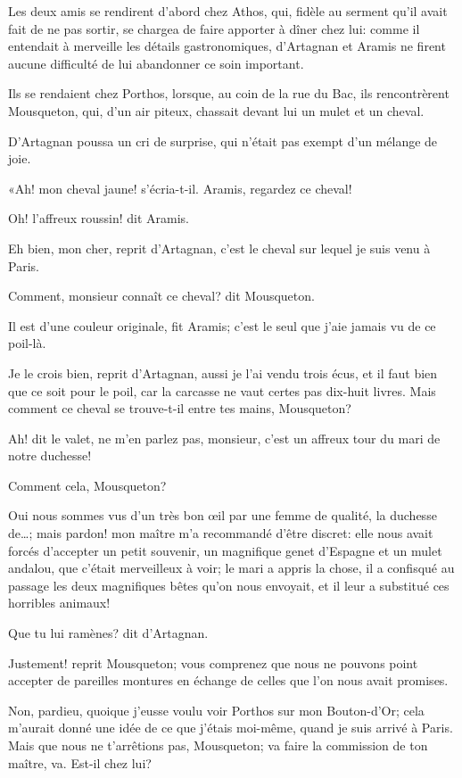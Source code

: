 Les deux amis se rendirent d'abord chez Athos, qui, fidèle au serment qu'il avait fait de ne pas sortir, se chargea de faire apporter à dîner chez lui: comme il entendait à merveille les détails gastronomiques, d'Artagnan et Aramis ne firent aucune difficulté de lui abandonner ce soin important. 

Ils se rendaient chez Porthos, lorsque, au coin de la rue du Bac, ils rencontrèrent Mousqueton, qui, d'un air piteux, chassait devant lui un mulet et un cheval. 

D'Artagnan poussa un cri de surprise, qui n'était pas exempt d'un mélange de joie. 

«Ah! mon cheval jaune! s'écria-t-il. Aramis, regardez ce cheval! 

\speak  Oh! l'affreux roussin! dit Aramis. 

\speak  Eh bien, mon cher, reprit d'Artagnan, c'est le cheval sur lequel je suis venu à Paris. 

\speak  Comment, monsieur connaît ce cheval? dit Mousqueton. 

\speak  Il est d'une couleur originale, fit Aramis; c'est le seul que j'aie jamais vu de ce poil-là. 

\speak  Je le crois bien, reprit d'Artagnan, aussi je l'ai vendu trois écus, et il faut bien que ce soit pour le poil, car la carcasse ne vaut certes pas dix-huit livres. Mais comment ce cheval se trouve-t-il entre tes mains, Mousqueton? 

\speak  Ah! dit le valet, ne m'en parlez pas, monsieur, c'est un affreux tour du mari de notre duchesse! 

\speak  Comment cela, Mousqueton? 

\speak  Oui nous sommes vus d'un très bon œil par une femme de qualité, la duchesse de\dots; mais pardon! mon maître m'a recommandé d'être discret: elle nous avait forcés d'accepter un petit souvenir, un magnifique genet d'Espagne et un mulet andalou, que c'était merveilleux à voir; le mari a appris la chose, il a confisqué au passage les deux magnifiques bêtes qu'on nous envoyait, et il leur a substitué ces horribles animaux! 

\speak  Que tu lui ramènes? dit d'Artagnan. 

\speak  Justement! reprit Mousqueton; vous comprenez que nous ne pouvons point accepter de pareilles montures en échange de celles que l'on nous avait promises. 

\speak  Non, pardieu, quoique j'eusse voulu voir Porthos sur mon Bouton-d'Or; cela m'aurait donné une idée de ce que j'étais moi-même, quand je suis arrivé à Paris. Mais que nous ne t'arrêtions pas, Mousqueton; va faire la commission de ton maître, va. Est-il chez lui? 


